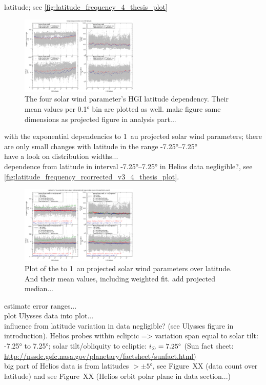 latitude; see \autoref{fig:latitude_frequency_4_thesis_plot}
\begin{figure}[htb]
	\centering
	\includegraphics[width=0.5\textwidth]{images/gnuplots/latitude_frequency_4_thesis_plot.png}
	\caption{The four solar wind parameter's HGI latitude dependency. Their mean values per 0.1° bin are plotted as well. make figure same dimensions as projected figure in analysis part...}
	\label{fig:latitude_frequency_4_thesis_plot}
\end{figure}

with the exponential dependencies to 1~au projected solar wind parameters; there are only small changes with latitude in the range -7.25°--7.25°\\
have a look on distribution widths...\\

dependence from latitude in interval -7.25°--7.25° in Helios data negligible?, see \autoref{fig:latitude_frequency_rcorrected_v3_4_thesis_plot}.
\begin{figure}[htb]
	\centering
	\includegraphics[width=0.5\textwidth]{images/gnuplots/latitude_frequency_rcorrected_v3_4_thesis_plot.png}
	\caption{Plot of the to 1~au projected solar wind parameters over latitude. And their mean values, including weighted fit. add projected median...}
	\label{fig:latitude_frequency_rcorrected_v3_4_thesis_plot}
\end{figure}
estimate error ranges...\\

plot Ulysses data into plot...\\

influence from latitude variation in data negligible? (see Ulysses figure in introduction). Helios probes within ecliptic => variation span equal to solar tilt: -7.25° to 7.25°; solar tilt/obliquity to ecliptic: $i_\odot = 7.25\degree$ (Sun fact sheet: \url{http://nssdc.gsfc.nasa.gov/planetary/factsheet/sunfact.html)}\\
big part of Helios data is from latitudes $>\pm5$°, see Figure~XX (data count over latitude) and see Figure~XX (Helios orbit polar plane in data section...)\\



